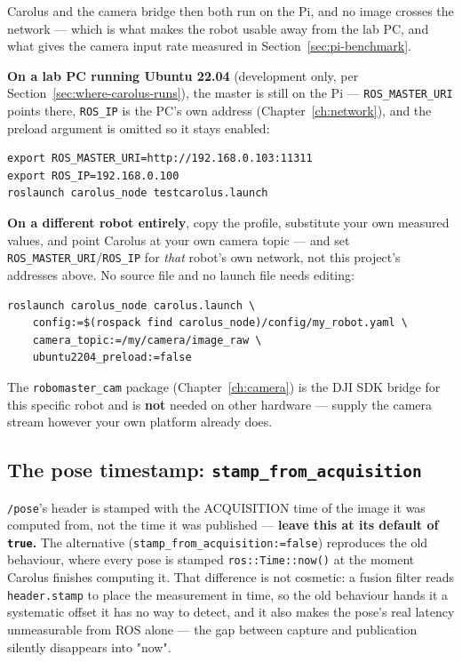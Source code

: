 \documentclass[11pt]{report}
\begin{document}
Carolus and the camera bridge then both run on the Pi, and no image crosses
the network --- which is what makes the robot usable away from the lab PC,
and what gives the camera input rate measured in
Section~\ref{sec:pi-benchmark}.

\textbf{On a lab PC running Ubuntu 22.04} (development only, per
Section~\ref{sec:where-carolus-runs}), the master is still on the Pi ---
\texttt{ROS\_MASTER\_URI} points there, \texttt{ROS\_IP} is the PC's own
address (Chapter~\ref{ch:network}), and the preload argument is omitted so
it stays enabled:

\begin{lstlisting}[style=shell]
export ROS_MASTER_URI=http://192.168.0.103:11311
export ROS_IP=192.168.0.100
roslaunch carolus_node testcarolus.launch
\end{lstlisting}

\textbf{On a different robot entirely}, copy the profile, substitute your own
measured values, and point Carolus at your own camera topic --- and set
\texttt{ROS\_MASTER\_URI}/\texttt{ROS\_IP} for \emph{that} robot's own
network, not this project's addresses above. No source file and no launch
file needs editing:

\begin{lstlisting}[style=shell]
roslaunch carolus_node carolus.launch \
    config:=$(rospack find carolus_node)/config/my_robot.yaml \
    camera_topic:=/my/camera/image_raw \
    ubuntu2204_preload:=false
\end{lstlisting}

The \texttt{robomaster\_cam} package (Chapter~\ref{ch:camera}) is the DJI SDK
bridge for this specific robot and is \textbf{not} needed on other hardware
--- supply the camera stream however your own platform already does.

\subsection{The pose timestamp: \texttt{stamp\_from\_acquisition}}

\texttt{/pose}'s header is stamped with the ACQUISITION time of the image it
was computed from, not the time it was published --- \textbf{leave this at
its default of \texttt{true}.} The alternative
(\texttt{stamp\_from\_acquisition:=false}) reproduces the old behaviour,
where every pose is stamped \texttt{ros::Time::now()} at the moment Carolus
finishes computing it. That difference is not cosmetic: a fusion filter
reads \texttt{header.stamp} to place the measurement in time, so the old
behaviour hands it a systematic offset it has no way to detect, and it also
makes the pose's real latency unmeasurable from ROS alone --- the gap
between capture and publication silently disappears into "now".
\end{document}
